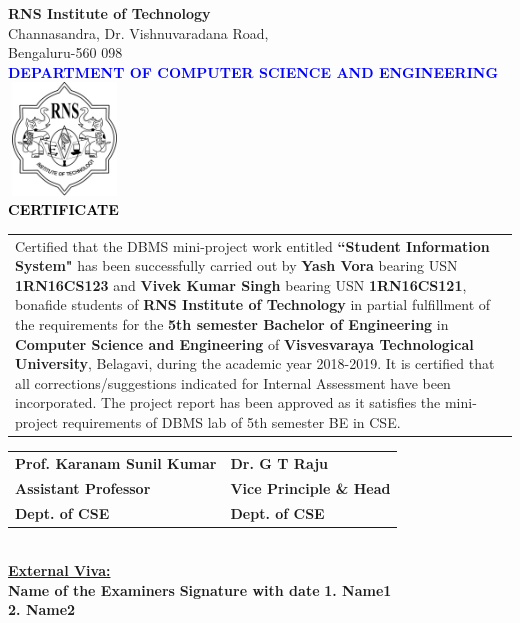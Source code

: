 \thispagestyle{empty}
\begin{center}
\break\break
\textup{\large {\textcolor{darkbrown}{\bf RNS Institute of Technology}} \\ 
{\normalsize{\textcolor{darkbrown}{Channasandra, Dr. Vishnuvaradana Road,\\ Bengaluru-560 098}}}}\\[0.1in]
\textup{\normalsize {\textcolor{blue}{\bf DEPARTMENT OF COMPUTER SCIENCE AND ENGINEERING}}}\\[0.1in]
\includegraphics[width=3cm, height=3cm]{./RNS_logo.png}\\[0.1in]
\textup{\large {\textcolor{black}{\textbf {CERTIFICATE}}}} \\[0.1in]
\end{center}

\justify
\begin{tabular}{p{15cm}}
\hspace{0.4cm} Certified that the DBMS mini-project work entitled \textbf{``Student Information System"} has been successfully carried out by \textbf{Yash Vora} bearing USN \textbf{1RN16CS123} and \textbf{Vivek Kumar Singh} bearing USN \textbf{1RN16CS121}, bonafide students of \textbf{RNS Institute of Technology } in partial fulfillment of the requirements for the \textbf{5th semester Bachelor of Engineering} in \textbf{Computer Science and Engineering} of \textbf{Visvesvaraya Technological University}, Belagavi, during the academic year 2018-2019. It is certified that all corrections/suggestions indicated for Internal Assessment have been incorporated. The project report has been approved as it satisfies the mini-project requirements of DBMS lab of 5th semester BE in CSE.\\[0.4in]
\end{tabular}

\justify
\begin{tabular}{l @{\hfill}  l}
\textbf{Prof. Karanam Sunil Kumar} & \hspace{6cm}\textbf{Dr. G T Raju}\\
\textbf{Assistant Professor} & \hspace{6cm}\textbf{Vice Principle \& Head}\\
\textbf{Dept. of CSE} & \hspace{6cm}\textbf{Dept. of CSE}\\[0.2in]
\end{tabular}
\\[0.1in]

\justify
\textup{\underline{\textbf{External Viva:}}} \\ 
\textup{\textbf{Name of the Examiners}}\hspace{7.3cm} {\textbf{Signature with date}} 
\justify
\textup{\textbf{1. Name1}} \\[0.2in]
\textup{\textbf{2. Name2}}
\newpage